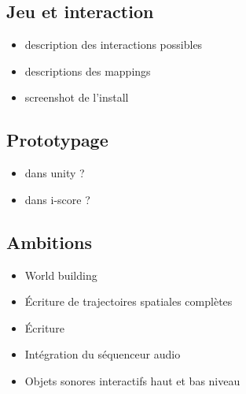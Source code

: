 \documentclass[french]{article}
\begin{document}
    \subsection*{Jeu et interaction}
    \begin{itemize}
    \item description des interactions possibles
    \item descriptions des mappings
    \item screenshot de l'install
    \end{itemize}
    
    \subsection*{Prototypage}
    \begin{itemize}
    \item dans unity ? 
    
    \item dans i-score ? 
    \end{itemize}
    
    \subsection*{Ambitions}
    \begin{itemize}
    \item World building
    \item Écriture de trajectoires spatiales complètes
    \item Écriture 
    \item Intégration du séquenceur audio
    \item Objets sonores interactifs haut et bas niveau
    \end{itemize}
\end{document}
